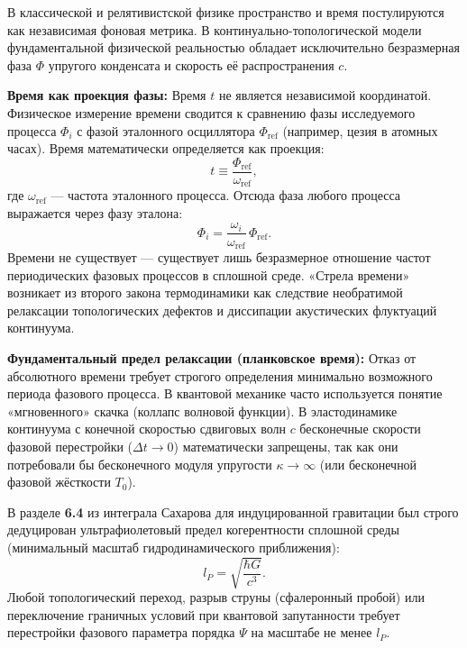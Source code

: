 \documentclass[11pt,a4paper]{article}
\begin{document}
В классической и релятивистской физике пространство и время постулируются как независимая фоновая метрика. В континуально-топологической модели фундаментальной физической реальностью обладает исключительно безразмерная фаза $\Phi$ упругого конденсата и скорость её распространения $c$.

\textbf{Время как проекция фазы:}
Время $t$ не является независимой координатой. Физическое измерение времени сводится к сравнению фазы исследуемого процесса $\Phi_i$ с фазой эталонного осциллятора $\Phi_{\text{ref}}$ (например, цезия в атомных часах). Время математически определяется как проекция:
\begin{equation}
	t \equiv \frac{\Phi_{\text{ref}}}{\omega_{\text{ref}}},
\end{equation}
где $\omega_{\text{ref}}$ — частота эталонного процесса. Отсюда фаза любого процесса выражается через фазу эталона:
\begin{equation}
	\Phi_i = \frac{\omega_i}{\omega_{\text{ref}}}\, \Phi_{\text{ref}}.
\end{equation}
Времени не существует — существует лишь безразмерное отношение частот периодических фазовых процессов в сплошной среде. «Стрела времени» возникает из второго закона термодинамики как следствие необратимой релаксации топологических дефектов и диссипации акустических флуктуаций континуума.

\textbf{Фундаментальный предел релаксации (планковское время):}
Отказ от абсолютного времени требует строгого определения минимально возможного периода фазового процесса. В квантовой механике часто используется понятие «мгновенного» скачка (коллапс волновой функции). В эластодинамике континуума с конечной скоростью сдвиговых волн $c$ бесконечные скорости фазовой перестройки ($\Delta t \to 0$) математически запрещены, так как они потребовали бы бесконечного модуля упругости $\kappa \to \infty$ (или бесконечной фазовой жёсткости $T_0$).

В разделе \textbf{6.4} из интеграла Сахарова для индуцированной гравитации был строго дедуцирован ультрафиолетовый предел когерентности сплошной среды (минимальный масштаб гидродинамического приближения):
\begin{equation}
	l_P = \sqrt{\frac{\hbar G}{c^3}}.
\end{equation}
Любой топологический переход, разрыв струны (сфалеронный пробой) или переключение граничных условий при квантовой запутанности требует перестройки фазового параметра порядка $\Psi$ на масштабе не менее $l_P$.
\end{document}
